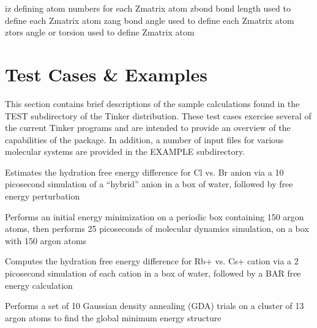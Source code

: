 \documentclass[letterpaper,11pt,english]{sphinxmanual}
\begin{document}
\sphinxAtStartPar
{}

\begin{sphinxVerbatim}[commandchars=\\\{\}]
iz              defining atom numbers for each Z\PYGZhy{}matrix atom
zbond           bond length used to define each Z\PYGZhy{}matrix atom
zang            bond angle used to define each Z\PYGZhy{}matrix atom
ztors           angle or torsion used to define Z\PYGZhy{}matrix atom
\end{sphinxVerbatim}

\sphinxstepscope


\chapter{Test Cases \& Examples}
\label{\detokenize{text/test-cases:test-cases-examples}}\label{\detokenize{text/test-cases::doc}}
\sphinxAtStartPar
This section contains brief descriptions of the sample calculations found in the TEST subdirectory of the Tinker distribution. These test cases exercise several of the current Tinker programs and are intended to provide an overview of the capabilities of the package. In addition, a number of input files for various molecular systems are provided in the EXAMPLE subdirectory.

\sphinxAtStartPar
{}

\sphinxAtStartPar
Estimates the hydration free energy difference for Cl\sphinxhyphen{} vs. Br\sphinxhyphen{} anion via a 10 picosecond simulation of a “hybrid” anion in a box of water, followed by free energy perturbation

\sphinxAtStartPar
{}

\sphinxAtStartPar
Performs an initial energy minimization on a periodic box containing 150 argon atoms, then performs 25 picoseconds of molecular dynamics simulation, on a box with 150 argon atoms

\sphinxAtStartPar
{}

\sphinxAtStartPar
Computes the hydration free energy difference for Rb+ vs. Cs+ cation via a 2 picosecond simulation of each cation in a box of water, followed by a BAR free energy calculation

\sphinxAtStartPar
{}

\sphinxAtStartPar
Performs a set of 10 Gaussian density annealing (GDA) trials on a cluster of 13 argon atoms to find the global minimum energy structure
\end{document}
